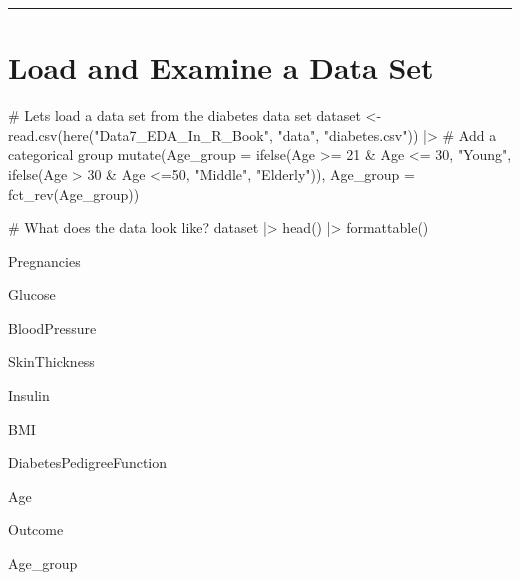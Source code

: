 \documentclass[
  letterpaper,
  DIV=11,
  numbers=noendperiod]{scrreprt}
\newenvironment{Shaded}{\begin{snugshade}}{\end{snugshade}}
\newcommand{\AttributeTok}[1]{\textcolor[rgb]{0.40,0.45,0.13}{#1}}
\newcommand{\CommentTok}[1]{\textcolor[rgb]{0.37,0.37,0.37}{#1}}
\newcommand{\DecValTok}[1]{\textcolor[rgb]{0.68,0.00,0.00}{#1}}
\newcommand{\FunctionTok}[1]{\textcolor[rgb]{0.28,0.35,0.67}{#1}}
\newcommand{\NormalTok}[1]{\textcolor[rgb]{0.00,0.23,0.31}{#1}}
\newcommand{\OtherTok}[1]{\textcolor[rgb]{0.00,0.23,0.31}{#1}}
\newcommand{\SpecialCharTok}[1]{\textcolor[rgb]{0.37,0.37,0.37}{#1}}
\newcommand{\StringTok}[1]{\textcolor[rgb]{0.13,0.47,0.30}{#1}}
\begin{document}
\begin{center}\rule{0.5\linewidth}{0.5pt}\end{center}

\hypertarget{load-and-examine-a-data-set-3}{%
\section{Load and Examine a Data
Set}\label{load-and-examine-a-data-set-3}}

\begin{Shaded}
\begin{Highlighting}[]
\CommentTok{\# Let\textquotesingle{}s load a data set from the diabetes data set}
\NormalTok{dataset }\OtherTok{\textless{}{-}} \FunctionTok{read.csv}\NormalTok{(}\FunctionTok{here}\NormalTok{(}\StringTok{"Data7\_EDA\_In\_R\_Book"}\NormalTok{, }\StringTok{"data"}\NormalTok{, }\StringTok{"diabetes.csv"}\NormalTok{)) }\SpecialCharTok{|\textgreater{}}
  \CommentTok{\# Add a categorical group}
  \FunctionTok{mutate}\NormalTok{(}\AttributeTok{Age\_group =} \FunctionTok{ifelse}\NormalTok{(Age }\SpecialCharTok{\textgreater{}=} \DecValTok{21} \SpecialCharTok{\&}\NormalTok{ Age }\SpecialCharTok{\textless{}=} \DecValTok{30}\NormalTok{, }\StringTok{"Young"}\NormalTok{, }
                            \FunctionTok{ifelse}\NormalTok{(Age }\SpecialCharTok{\textgreater{}} \DecValTok{30} \SpecialCharTok{\&}\NormalTok{ Age }\SpecialCharTok{\textless{}=}\DecValTok{50}\NormalTok{, }\StringTok{"Middle"}\NormalTok{, }
                                   \StringTok{"Elderly"}\NormalTok{)),}
         \AttributeTok{Age\_group =} \FunctionTok{fct\_rev}\NormalTok{(Age\_group))}

\CommentTok{\# What does the data look like?}
\NormalTok{dataset }\SpecialCharTok{|\textgreater{}}
  \FunctionTok{head}\NormalTok{() }\SpecialCharTok{|\textgreater{}}
  \FunctionTok{formattable}\NormalTok{()}
\end{Highlighting}
\end{Shaded}

Pregnancies

Glucose

BloodPressure

SkinThickness

Insulin

BMI

DiabetesPedigreeFunction

Age

Outcome

Age\_group
\end{document}
